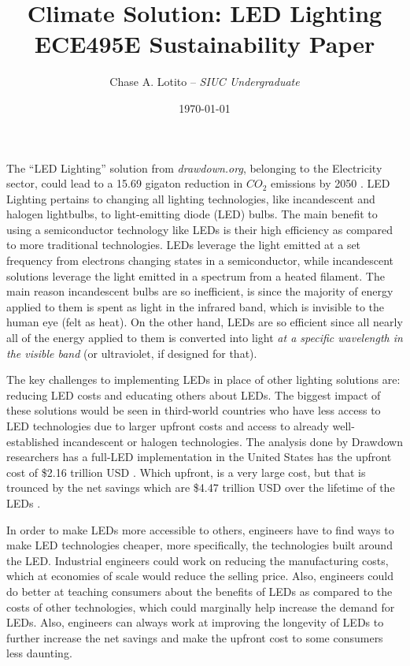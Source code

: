 \documentclass{article}
\title{\textbf{Climate Solution: LED Lighting} \\ {\large ECE495E Sustainability Paper}}
\author{Chase A. Lotito -- \textit{SIUC Undergraduate}}
\date{\today}
\begin{document}
\maketitle


The ``LED Lighting'' solution from \textit{drawdown.org}, belonging to the Electricity sector, could lead to a 15.69 gigaton reduction in \(CO_2\) emissions by 2050 \cite{drawdown}. LED Lighting pertains to changing all lighting technologies, like incandescent and halogen lightbulbs, to light-emitting diode (LED) bulbs. The main benefit to using a semiconductor technology like LEDs is their high efficiency as compared to more traditional technologies. LEDs leverage the light emitted at a set frequency from electrons changing states in a semiconductor, while incandescent solutions leverage the light emitted in a spectrum from a heated filament. The main reason incandescent bulbs are so inefficient, is since the majority of energy applied to them is spent as light in the infrared band, which is invisible to the human eye (felt as heat). On the other hand, LEDs are so efficient since all nearly all of the energy applied to them is converted into light \textit{at a specific wavelength in the visible band} (or ultraviolet, if designed for that).


The key challenges to implementing LEDs in place of other lighting solutions are: reducing LED costs and educating others about LEDs. The biggest impact of these solutions would be seen in third-world countries who have less access to LED technologies due to larger upfront costs and access to already well-established incandescent or halogen technologies. The analysis done by Drawdown researchers has a full-LED implementation in the United States has the upfront cost of \$2.16 trillion USD \cite{drawdown}. Which upfront, is a very large cost, but that is trounced by the net savings which are \$4.47 trillion USD over the lifetime of the LEDs \cite{drawdown}.


In order to make LEDs more accessible to others, engineers have to find ways to make LED technologies cheaper, more specifically, the technologies built around the LED. Industrial engineers could work on reducing the manufacturing costs, which at economies of scale would reduce the selling price. Also, engineers could do better at teaching consumers about the benefits of LEDs as compared to the costs of other technologies, which could marginally help increase the demand for LEDs. Also, engineers can always work at improving the longevity of LEDs to further increase the net savings and make the upfront cost to some consumers less daunting.
\end{document}
